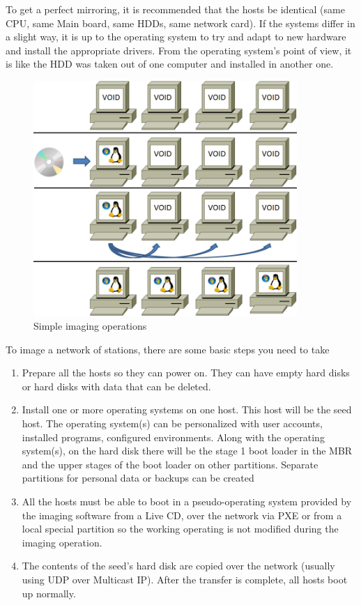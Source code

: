 To get a perfect mirroring, it is recommended that the hosts be
identical (same CPU, same Main board, same \ac{HDD}s, same network card).
If the systems differ in a slight way, it is up to the operating
system to try and adapt to new hardware and install the appropriate
drivers.  From the operating system’s point of view, it is like the
HDD was taken out of one computer and installed in another one.

\begin{figure}[h]
\includegraphics[width=10cm]{img/4comp}
\caption{Simple imaging operations}
\label{fig:4comp}
\end{figure}


To image a network of stations, there are some basic steps you need to take

\begin{enumerate}
\setcounter{enumi}{0}
\item Prepare all the hosts so they can power on. They can have empty
hard disks or hard disks with data that can be deleted.


\item Install one or more operating systems on one host.  This host will
be the seed host.  The operating system(s) can be personalized with
user accounts, installed programs, configured environments. Along with
the operating system(s), on the hard disk there will be the stage 1
boot loader in the \ac{MBR} and the upper stages of the boot loader on
other partitions. Separate partitions for personal data or backups can
be created


\item All the hosts must be able to boot in a pseudo-operating system
provided by the imaging software from a Live CD,  over the network via
PXE or from a local special partition so the working operating is not
modified during the imaging operation.


\item The contents of the seed’s hard disk are copied over the network
(usually using UDP over Multicast IP).  After the transfer is
complete, all hosts boot up normally.
\end{enumerate}



